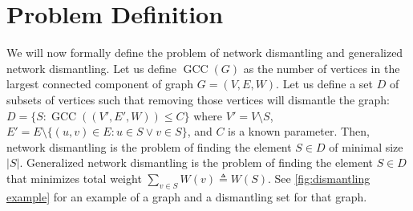 \documentclass{article}
\DeclareMathOperator{\GCC}{GCC}
\begin{document}
\section{Problem Definition}

\null\quad We will now formally define the problem of network dismantling and generalized network dismantling. Let us define $\GCC(G)$ as the number of vertices in the largest connected component of graph $G = (V,E,W)$. Let us define a set $D$ of subsets of vertices such that removing those vertices will dismantle the graph: $D = \{ S : \GCC((V', E', W)) \leq C \}$ where $V' = V \setminus S$, $E' = E \setminus \{ (u,v) \in E : u \in S \vee v \in S \}$, and $C$ is a known parameter. Then, network dismantling is the problem of finding the element $S \in D$ of minimal size $|S|$. Generalized network dismantling is the problem of finding the element $S \in D$ that minimizes total weight $\sum_{v \in S} W(v) \triangleq W(S)$. See \ref{fig:dismantling example} for an example of a graph and a dismantling set for that graph.
\end{document}
